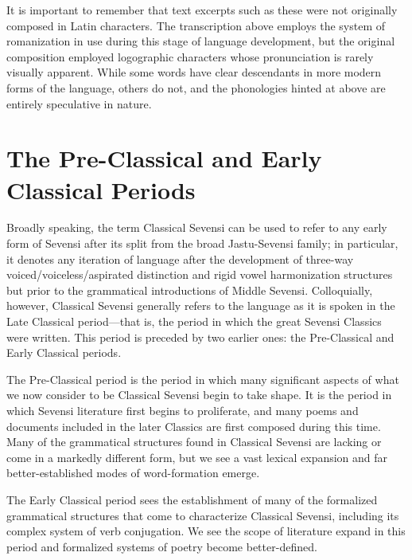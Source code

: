 It is important to remember that text excerpts such as these were not originally composed in Latin characters.
The transcription above employs the system of romanization in use during this stage of language development, but the original composition employed logographic characters whose pronunciation is rarely visually apparent.
While some words have clear descendants in more modern forms of the language, others do not, and the phonologies hinted at above are entirely speculative in nature.

\section{The Pre-Classical and Early Classical Periods}

Broadly speaking, the term Classical Sevensi can be used to refer to any early form of Sevensi after its split from the broad Jastu-Sevensi family; in particular, it denotes any iteration of language after the development of three-way voiced/voiceless/aspirated distinction and rigid vowel harmonization structures but prior to the grammatical introductions of Middle Sevensi.
Colloquially, however, Classical Sevensi generally refers to the language as it is spoken in the Late Classical period—that is, the period in which the great Sevensi Classics were written.
This period is preceded by two earlier ones: the Pre-Classical and Early Classical periods.

The Pre-Classical period is the period in which many significant aspects of what we now consider to be Classical Sevensi begin to take shape.
It is the period in which Sevensi literature first begins to proliferate, and many poems and documents included in the later Classics are first composed during this time.
Many of the grammatical structures found in Classical Sevensi are lacking or come in a markedly different form, but we see a vast lexical expansion and far better-established modes of word-formation emerge.

The Early Classical period sees the establishment of many of the formalized grammatical structures that come to characterize Classical Sevensi, including its complex system of verb conjugation.
We see the scope of literature expand in this period and formalized systems of poetry become better-defined.
